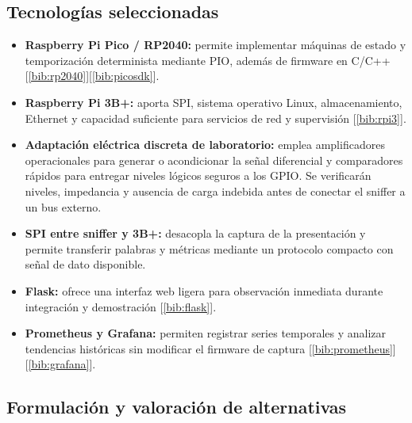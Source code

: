 \documentclass[12pt,a4paper,oneside]{article}
\newcommand{\citeref}[1]{[\ref{#1}]}
\begin{document}
\subsection{Tecnologías seleccionadas}

\begin{itemize}
  \item \textbf{Raspberry Pi Pico / RP2040:} permite implementar máquinas de estado y temporización determinista mediante PIO, además de firmware en C/C++ \citeref{bib:rp2040}\citeref{bib:picosdk}.
  \item \textbf{Raspberry Pi 3B+:} aporta SPI, sistema operativo Linux, almacenamiento, Ethernet y capacidad suficiente para servicios de red y supervisión \citeref{bib:rpi3}.
  \item \textbf{Adaptación eléctrica discreta de laboratorio:} emplea amplificadores operacionales para generar o acondicionar la señal diferencial y comparadores rápidos para entregar niveles lógicos seguros a los GPIO. Se verificarán niveles, impedancia y ausencia de carga indebida antes de conectar el sniffer a un bus externo.
  \item \textbf{SPI entre sniffer y 3B+:} desacopla la captura de la presentación y permite transferir palabras y métricas mediante un protocolo compacto con señal de dato disponible.
  \item \textbf{Flask:} ofrece una interfaz web ligera para observación inmediata durante integración y demostración \citeref{bib:flask}.
  \item \textbf{Prometheus y Grafana:} permiten registrar series temporales y analizar tendencias históricas sin modificar el firmware de captura \citeref{bib:prometheus}\citeref{bib:grafana}.
\end{itemize}

\subsection{Formulación y valoración de alternativas}
\end{document}
